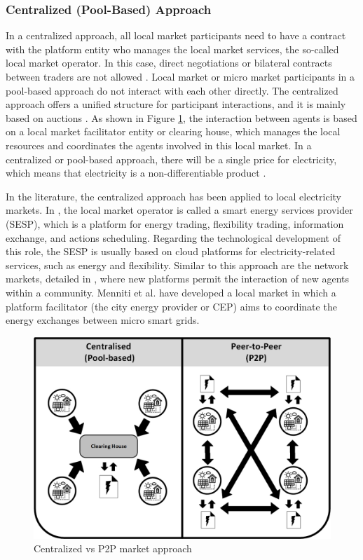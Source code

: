\subsubsection{Centralized (Pool-Based) Approach}
In a centralized approach, all local market participants need to have a contract with the platform entity who manages the local market services, the so-called local market operator. In this case, direct negotiations or bilateral contracts between traders are not allowed \cite{DesignElectricityMarketRossetoo2017}. Local market or micro market participants in a pool-based approach do not interact with each other directly. The centralized approach offers a unified structure for participant interactions, and it is mainly based on auctions \cite{vytelingum2010trading}. As shown in Figure \ref{fig:POOL_P2P}, the interaction between agents is based on a local market facilitator entity or clearing house, which manages the local resources and coordinates the agents involved in this local market. In a centralized or pool-based approach, there will be a single price for electricity, which means that electricity is a non-differentiable product \cite{Pinson2017}.

In the literature, the centralized approach has been applied to local electricity markets. In \cite{ilieva2016design}, the local market operator is called a smart energy services provider (SESP), which is a platform for energy trading, flexibility trading, information exchange, and actions scheduling. Regarding the technological development of this role, the SESP is usually based on cloud platforms for electricity-related services, such as energy and flexibility. Similar to this approach are the network markets, detailed in \cite{parker2016platform}, where new platforms permit the interaction of new agents within a community. Menniti et al. \cite{menniti2014future} have developed a local market in which a platform facilitator (the city energy provider or CEP) aims to coordinate the energy exchanges between micro smart grids. 


\begin{figure}[h]
	\centering
	\includegraphics[width=0.7\columnwidth ]{ChapterIntro/Figures/CENTRALISED_P2P.jpg}
		\caption{Centralized vs P2P market approach}
	\label{fig:POOL_P2P}  
\end{figure}

